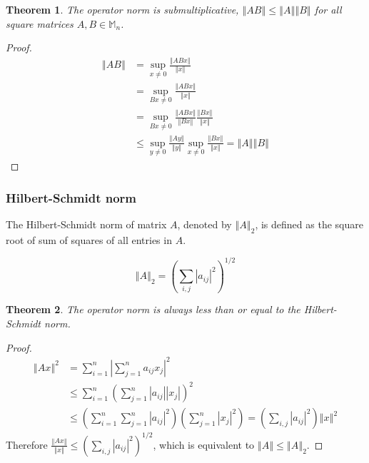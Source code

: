 \documentclass[twoside]{article}
\newcommand*\norm[1]{\left \Vert #1 \right\Vert}
\newcommand*\abs[1]{\left \vert #1 \right\vert}
\theoremstyle{plain}
\newtheorem{theorem}{Theorem}
\theoremstyle{definition}
\theoremstyle{remark}
\begin{document}
\begin{theorem}\label{submulti} The operator norm is submultiplicative,  \(\norm{AB} \le \norm{A} \norm{B}\) for all square matrices \(A, B \in \mathbb{M}_n\). \end{theorem}
\begin{proof} \begin{equation*} \begin{split}
 \norm{AB} & = \sup_{x \ne 0} \frac{\norm{ABx}}{\norm{x}}\\
 & = \sup_{Bx \ne 0} \frac{\norm{ABx}}{\norm{x}} \\
& = \sup_{Bx \ne 0} \frac{\norm{ABx}}{\norm{Bx}} \frac{\norm{Bx}}{\norm{x}} \\
& \le \sup_{y \ne 0} \frac{\norm{Ay}}{\norm{y}} \sup_{x \ne 0} \frac{\norm{Bx}}{\norm{x}} = \norm{A} \norm{B} 
\end{split} \end{equation*}\end{proof}

\subsubsection{Hilbert-Schmidt norm}

The Hilbert-Schmidt norm of matrix \(A\), denoted by \(\norm{A}_2\),  is defined as the square root of sum of squares of all entries in \(A\). 

 \[\norm{A}_2 = \left( \sum_{i, j} \abs{a_{ij}}^2 \right) ^{1/2}\]


\begin{theorem} The operator norm is always less than or equal to the Hilbert-Schmidt norm. \end{theorem}
\begin{proof}
 \begin{equation*} \begin{split} 
\norm{Ax}^2 & = \sum_{i = 1} ^ n \abs{\sum_{j = 1} ^ n a_{ij} x_j}^2 \\
& \le  \sum_{i = 1} ^ n \left( \sum_{j = 1} ^ n \abs{a_{ij}} \abs{ x_j}\right) ^2 \\
& \le \left( \sum_{i = 1}^n \sum_{j = 1}^n \abs{a_{ij}}^2\right) \left( \sum_{j=1}^n \abs{x_j}^2 \right)  = \left( \sum_{i, j} \abs{a_{ij}}^2 \right) \norm{x}^2
\end{split}
\end{equation*} 
Therefore \(\displaystyle \frac{\norm{Ax}}{\norm{x}} \le \left( \sum_{i, j} \abs{a_{ij}}^2 \right) ^{1/2}\), which is equivalent to \(\norm{A} \le \norm{A}_2\).
\end{proof}
\end{document}
